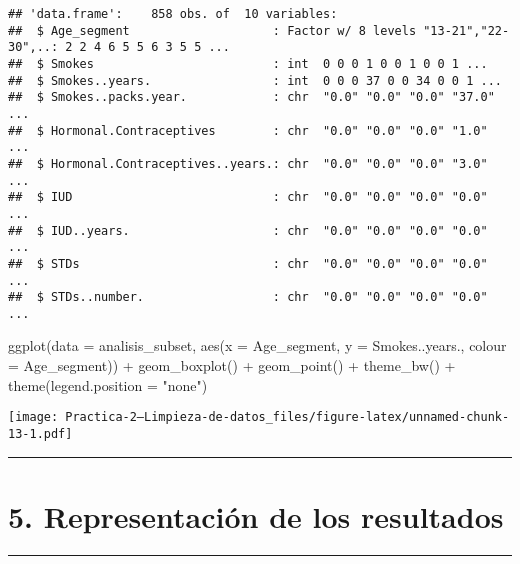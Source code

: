 \documentclass[
]{article}
\newenvironment{Shaded}{\begin{snugshade}}{\end{snugshade}}
\newcommand{\AttributeTok}[1]{\textcolor[rgb]{0.80,0.80,0.80}{#1}}
\newcommand{\FunctionTok}[1]{\textcolor[rgb]{0.94,0.94,0.56}{#1}}
\newcommand{\NormalTok}[1]{\textcolor[rgb]{0.80,0.80,0.80}{#1}}
\newcommand{\SpecialCharTok}[1]{\textcolor[rgb]{0.86,0.64,0.64}{#1}}
\newcommand{\StringTok}[1]{\textcolor[rgb]{0.80,0.58,0.58}{#1}}
\begin{document}
\begin{verbatim}
## 'data.frame':    858 obs. of  10 variables:
##  $ Age_segment                    : Factor w/ 8 levels "13-21","22-30",..: 2 2 4 6 5 5 6 3 5 5 ...
##  $ Smokes                         : int  0 0 0 1 0 0 1 0 0 1 ...
##  $ Smokes..years.                 : int  0 0 0 37 0 0 34 0 0 1 ...
##  $ Smokes..packs.year.            : chr  "0.0" "0.0" "0.0" "37.0" ...
##  $ Hormonal.Contraceptives        : chr  "0.0" "0.0" "0.0" "1.0" ...
##  $ Hormonal.Contraceptives..years.: chr  "0.0" "0.0" "0.0" "3.0" ...
##  $ IUD                            : chr  "0.0" "0.0" "0.0" "0.0" ...
##  $ IUD..years.                    : chr  "0.0" "0.0" "0.0" "0.0" ...
##  $ STDs                           : chr  "0.0" "0.0" "0.0" "0.0" ...
##  $ STDs..number.                  : chr  "0.0" "0.0" "0.0" "0.0" ...
\end{verbatim}

\begin{Shaded}
\begin{Highlighting}[]
\FunctionTok{ggplot}\NormalTok{(}\AttributeTok{data =}\NormalTok{ analisis\_subset, }\FunctionTok{aes}\NormalTok{(}\AttributeTok{x =}\NormalTok{ Age\_segment, }\AttributeTok{y =}\NormalTok{ Smokes..years., }\AttributeTok{colour =}\NormalTok{ Age\_segment)) }\SpecialCharTok{+}
  \FunctionTok{geom\_boxplot}\NormalTok{() }\SpecialCharTok{+}
  \FunctionTok{geom\_point}\NormalTok{() }\SpecialCharTok{+}
  \FunctionTok{theme\_bw}\NormalTok{() }\SpecialCharTok{+}
  \FunctionTok{theme}\NormalTok{(}\AttributeTok{legend.position =} \StringTok{"none"}\NormalTok{)}
\end{Highlighting}
\end{Shaded}

\texttt{[image: Practica-2---Limpieza-de-datos\_files/figure-latex/unnamed-chunk-13-1.pdf]}

\begin{center}\rule{0.5\linewidth}{0.5pt}\end{center}

\hypertarget{representaciuxf3n-de-los-resultados}{%
\section{5. Representación de los
resultados}\label{representaciuxf3n-de-los-resultados}}

\begin{center}\rule{0.5\linewidth}{0.5pt}\end{center}
\end{document}
